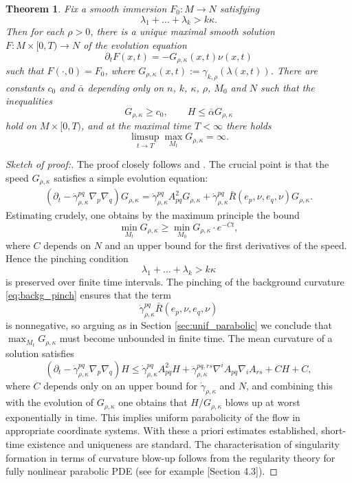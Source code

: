 \documentclass[12pt]{amsart}
\newtheorem{theorem}{Theorem}[section]
\begin{document}
\begin{theorem}
\label{thm:short_time_N}
Fix a smooth immersion $F_0 : M \to N$ satisfying 
\[\lambda_1 + \dots + \lambda_k > k \kappa.\]
Then for each $\rho>0$, there is a unique maximal smooth solution $F:M\times[0,T) \to N$ of the evolution equation
\begin{equation}
\label{eq:CF_shifted}
\partial_t F(x,t) = - G_{\rho,\kappa}(x,t) \nu(x,t)
\end{equation}
such that $F(\cdot,0) = F_0$, where $G_{\rho,\kappa}(x,t) := \gamma_{k,\rho}(\lambda(x,t))$. There are constants $c_0$ and $\bar \alpha$ depending only on $n$, $k$, $\kappa$, $\rho$, $M_0$ and $N$ such that the inequalities
\begin{equation}
\label{eq:pinch_pres_N}
G_{\rho,\kappa} \geq c_0, \qquad H\leq \bar \alpha G_{\rho, \kappa}
\end{equation}
hold on $M\times[0,T)$, and at the maximal time $T < \infty$ there holds 
\[\limsup_{t \to T} \max_{M_t} G_{\rho,\kappa} = \infty.\]
\end{theorem}
\begin{proof}[Sketch of proof:]
The proof closely follows \cite{And94} and \cite{Bren-Huisk17}. The crucial point is that the speed $G_{\rho, \kappa}$ satisfies a simple evolution equation:
\begin{align*}
(\partial_t - \dot \gamma_{\rho,\kappa}^{pq} \nabla_p \nabla_q) G_{\rho, \kappa} =  \dot \gamma_{\rho,\kappa}^{pq} A_{pq}^2 G_{\rho,\kappa} + \dot \gamma_{\rho,\kappa}^{pq} \bar R(e_p, \nu, e_q, \nu ) G_{\rho, \kappa}.
\end{align*}
Estimating crudely, one obtains by the maximum principle the bound
\[\min_{M_t} G_{\rho, \kappa} \geq \min_{M_0} G_{\rho, \kappa} \cdot e^{-Ct},\]
where $C$ depends on $N$ and an upper bound for the first derivatives of the speed. Hence the pinching condition 
\[\lambda_1 + \dots + \lambda_k > k \kappa\]
is preserved over finite time intervals. The pinching of the background curvature \eqref{eq:backg_pinch} ensures that the term 
\[\dot \gamma_{\rho,\kappa}^{pq} \bar R(e_p, \nu, e_q, \nu )\]
is nonnegative, so arguing as in Section \ref{sec:unif_parabolic} we conclude that $\max_{M_t} G_{\rho,\kappa}$ must become unbounded in finite time. The mean curvature of a solution satisfies 
\[(\partial_t - \dot \gamma_{\rho,\kappa}^{pq} \nabla_p \nabla_q) H \leq \dot \gamma_{\rho,\kappa}^{pq} A_{pq}^2 H + \ddot \gamma_{\rho,\kappa}^{pq,rs} \nabla^i A_{pq} \nabla_i A_{rs} + CH + C,\]
where $C$ depends only on an upper bound for $\dot \gamma_{\rho, \kappa}$ and $N$, and combining this with the evolution of $G_{\rho,\kappa}$ one obtains that $H/G_{\rho, \kappa}$ blows up at worst exponentially in time. This implies uniform parabolicity of the flow in appropriate coordinate systems. With these a priori estimates established, short-time existence and uniqueness are standard. The characterisation of singularity formation in terms of curvature blow-up follows from the regularity theory for fully nonlinear parabolic PDE (see for example \cite{Lang14}[Section 4.3]). 
\end{proof}
\end{document}
